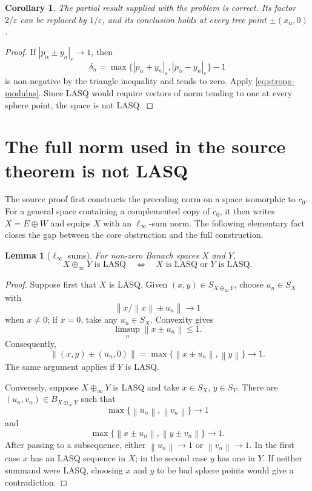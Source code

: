 \documentclass[11pt]{article}
\newtheorem{lemma}[theorem]{Lemma}
\newtheorem{corollary}[theorem]{Corollary}
\newcommand{\eps}{\varepsilon}
\newcommand{\norm}[1]{\left\lVert #1\right\rVert}
\newcommand{\sourceNorm}[1]{\left\lvert #1\right\rvert_{\eps}}
\begin{document}
\begin{corollary}
\label{cor:partial-correct}
The partial result supplied with the problem is correct.  Its factor $2/\eps$ can be replaced by $1/\eps$, and its conclusion holds at every tree point $\pm(x_\alpha,0)$.
\end{corollary}

\begin{proof}
If $\sourceNorm{p_\alpha\pm y_n}\to1$, then
\[
 \delta_n=\max\{\sourceNorm{p_\alpha+y_n},\sourceNorm{p_\alpha-y_n}\}-1
\]
is non-negative by the triangle inequality and tends to zero.  Apply \eqref{eq:strong-modulus}.  Since LASQ would require vectors of norm tending to one at every sphere point, the space is not LASQ.
\end{proof}

\section{The full norm used in the source theorem is not LASQ}
\label{sec:full-source}

The source proof first constructs the preceding norm on a space isomorphic to $c_0$.  For a general space containing a complemented copy of $c_0$, it then writes $X=E\oplus W$ and equips $X$ with an $\ell_\infty$-sum norm.  The following elementary fact closes the gap between the core obstruction and the full construction.

\begin{lemma}[$\ell_\infty$ sums]
\label{lem:linfty-lasq}
For non-zero Banach spaces $X$ and $Y$,
\[
 X\oplus_\infty Y\text{ is LASQ}
 \quad\Longleftrightarrow\quad
 X\text{ is LASQ or }Y\text{ is LASQ}.
\]
\end{lemma}

\begin{proof}
Suppose first that $X$ is LASQ.  Given $(x,y)\in S_{X\oplus_\infty Y}$, choose $u_n\in S_X$ with
\[
 \norm{x/\norm{x}\pm u_n}\to1
\]
when $x\ne0$; if $x=0$, take any $u_n\in S_X$.  Convexity gives
\[
 \limsup_n\norm{x\pm u_n}\le1.
\]
Consequently,
\[
 \norm{(x,y)\pm(u_n,0)}
 =\max\{\norm{x\pm u_n},\norm{y}\}\longrightarrow1.
\]
The same argument applies if $Y$ is LASQ.

Conversely, suppose $X\oplus_\infty Y$ is LASQ and take $x\in S_X$, $y\in S_Y$.  There are $(u_n,v_n)\in B_{X\oplus_\infty Y}$ such that
\[
 \max\{\norm{u_n},\norm{v_n}\}\to1
\]
and
\[
 \max\{\norm{x\pm u_n},\norm{y\pm v_n}\}\to1.
\]
After passing to a subsequence, either $\norm{u_n}\to1$ or $\norm{v_n}\to1$.  In the first case $x$ has an LASQ sequence in $X$; in the second case $y$ has one in $Y$.  If neither summand were LASQ, choosing $x$ and $y$ to be bad sphere points would give a contradiction.
\end{proof}
\end{document}
